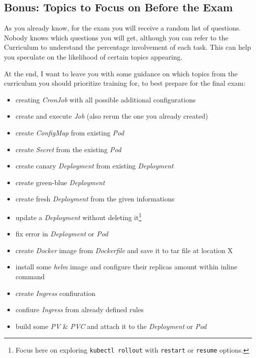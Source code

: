 \subsection{Bonus: Topics to Focus on Before the Exam}

As you already know, for the exam you will receive a random list of questions. Nobody knows which questions you will get, although you can refer to the Curriculum\cite{cncf-curriculum} to understand the percentage involvement of each task. This can help you speculate on the likelihood of certain topics appearing.

At the end, I want to leave you with some guidance on which topics from the curriculum you should prioritize training for, to best prepare for the final exam:

\begin{itemize} 
	\item creating \textit{CronJob} with all possible additional configurations 
	\item create and execute \textit{Job} (also rerun the one you already created)
	\item create \textit{ConfigMap} from existing \textit{Pod}
	\item create \textit{Secret} from the existing \textit{Pod}
	\item create canary \textit{Deployment} from existing \textit{Deployment}
	\item create green-blue \textit{Deployment}
	\item create fresh \textit{Deployment} from the given informations
	\item update a \textit{Deployment} without deleting it\footnote{Focus here on exploring \texttt{kubectl rollout} with \texttt{restart} or \texttt{resume} options.}
	\item fix error in \textit{Deployment} or \textit{Pod}
	\item create \textit{Docker} image from \textit{Dockerfile} and save it to tar file at location X
	\item install some \textit{helm} image and configure their replicas amount within inline command
	\item create \textit{Ingress} confiuration
	\item confiure \textit{Ingress} from already defined rules
	\item build some \textit{PV} \& \textit{PVC} and attach it to the \textit{Deployment} or \textit{Pod}
\end{itemize}


